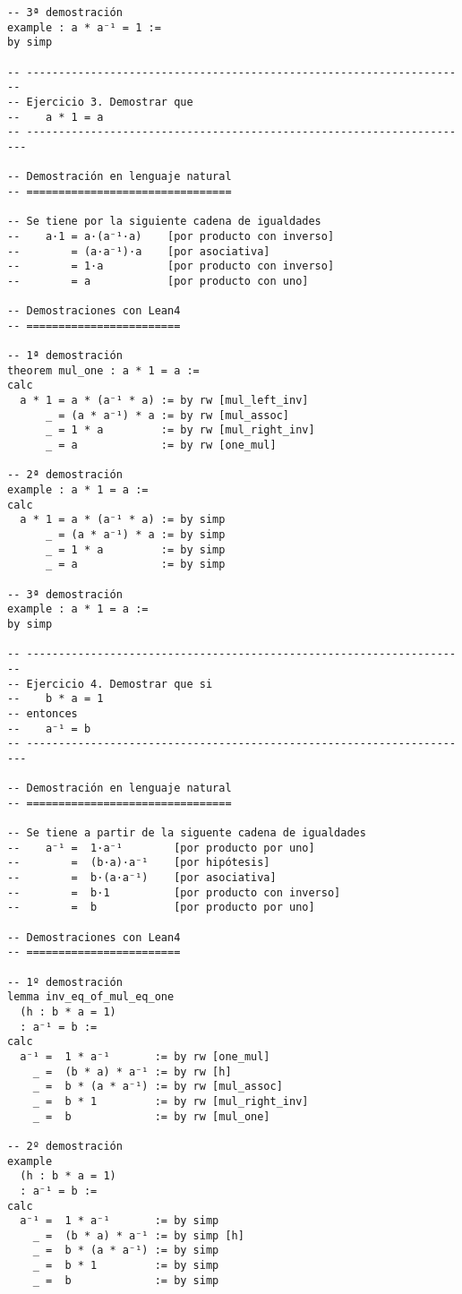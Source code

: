 \begin{verbatim}
-- 3ª demostración
example : a * a⁻¹ = 1 :=
by simp

-- ---------------------------------------------------------------------
-- Ejercicio 3. Demostrar que
--    a * 1 = a
-- ----------------------------------------------------------------------

-- Demostración en lenguaje natural
-- ================================

-- Se tiene por la siguiente cadena de igualdades
--    a·1 = a·(a⁻¹·a)    [por producto con inverso]
--        = (a·a⁻¹)·a    [por asociativa]
--        = 1·a          [por producto con inverso]
--        = a            [por producto con uno]

-- Demostraciones con Lean4
-- ========================

-- 1ª demostración
theorem mul_one : a * 1 = a :=
calc
  a * 1 = a * (a⁻¹ * a) := by rw [mul_left_inv]
      _ = (a * a⁻¹) * a := by rw [mul_assoc]
      _ = 1 * a         := by rw [mul_right_inv]
      _ = a             := by rw [one_mul]

-- 2ª demostración
example : a * 1 = a :=
calc
  a * 1 = a * (a⁻¹ * a) := by simp
      _ = (a * a⁻¹) * a := by simp
      _ = 1 * a         := by simp
      _ = a             := by simp

-- 3ª demostración
example : a * 1 = a :=
by simp

-- ---------------------------------------------------------------------
-- Ejercicio 4. Demostrar que si
--    b * a = 1
-- entonces
--    a⁻¹ = b
-- ----------------------------------------------------------------------

-- Demostración en lenguaje natural
-- ================================

-- Se tiene a partir de la siguente cadena de igualdades
--    a⁻¹ =  1·a⁻¹        [por producto por uno]
--        =  (b·a)·a⁻¹    [por hipótesis]
--        =  b·(a·a⁻¹)    [por asociativa]
--        =  b·1          [por producto con inverso]
--        =  b            [por producto por uno]

-- Demostraciones con Lean4
-- ========================

-- 1º demostración
lemma inv_eq_of_mul_eq_one
  (h : b * a = 1)
  : a⁻¹ = b :=
calc
  a⁻¹ =  1 * a⁻¹       := by rw [one_mul]
    _ =  (b * a) * a⁻¹ := by rw [h]
    _ =  b * (a * a⁻¹) := by rw [mul_assoc]
    _ =  b * 1         := by rw [mul_right_inv]
    _ =  b             := by rw [mul_one]

-- 2º demostración
example
  (h : b * a = 1)
  : a⁻¹ = b :=
calc
  a⁻¹ =  1 * a⁻¹       := by simp
    _ =  (b * a) * a⁻¹ := by simp [h]
    _ =  b * (a * a⁻¹) := by simp
    _ =  b * 1         := by simp
    _ =  b             := by simp


\end{verbatim}
